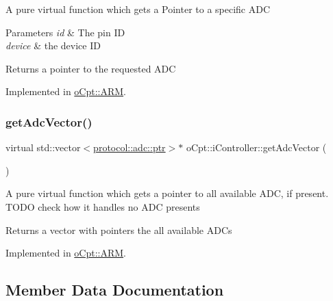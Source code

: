 A pure virtual function which gets a Pointer to a specific A\+DC 
\begin{DoxyParams}{Parameters}
{\em id} & The pin ID \\
\hline
{\em device} & the device ID \\
\hline
\end{DoxyParams}
\begin{DoxyReturn}{Returns}
a pointer to the requested A\+DC 
\end{DoxyReturn}


Implemented in \hyperlink{classo_cpt_1_1_a_r_m_a2f773bcd04719d81994af8930ca974bd}{o\+Cpt\+::\+A\+RM}.

\hypertarget{classo_cpt_1_1i_controller_af414ebaf64b79ac45d1275e62799e36c}{}\label{classo_cpt_1_1i_controller_af414ebaf64b79ac45d1275e62799e36c} 
\subsubsection{\texorpdfstring{get\+Adc\+Vector()}{getAdcVector()}}
{\footnotesize\ttfamily virtual std\+::vector$<$\hyperlink{classo_cpt_1_1protocol_1_1adc_a94af68cb9c573629a4a1a16f8ebd3dff}{protocol\+::adc\+::ptr}$>$$\ast$ o\+Cpt\+::i\+Controller\+::get\+Adc\+Vector (\begin{DoxyParamCaption}{ }\end{DoxyParamCaption})\hspace{0.3cm}{\ttfamily [pure virtual]}}

A pure virtual function which gets a pointer to all available A\+DC, if present. T\+O\+DO check how it handles no A\+DC presents \begin{DoxyReturn}{Returns}
a vector with pointers the all available A\+D\+Cs 
\end{DoxyReturn}


Implemented in \hyperlink{classo_cpt_1_1_a_r_m_a32e77e29e34f3114f0b766b705366ba8}{o\+Cpt\+::\+A\+RM}.



\subsection{Member Data Documentation}
\hypertarget{classo_cpt_1_1i_controller_ad385bb3078176cd3df8a9e51cfdab68a}{}\label{classo_cpt_1_1i_controller_ad385bb3078176cd3df8a9e51cfdab68a} 
